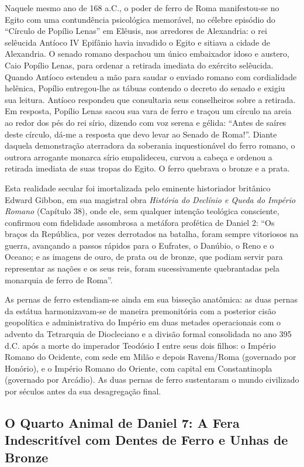 Naquele mesmo ano de 168 a.C., o poder de ferro de Roma manifestou-se no Egito com uma contundência psicológica memorável, no célebre episódio do ``Círculo de Popílio Lenas'' em Elêusis, nos arredores de Alexandria: o rei selêucida Antíoco IV Epifânio havia invadido o Egito e sitiava a cidade de Alexandria. O senado romano despachou um único embaixador idoso e austero, Caio Popílio Lenas, para ordenar a retirada imediata do exército selêucida. Quando Antíoco estendeu a mão para saudar o enviado romano com cordialidade helênica, Popílio entregou-lhe as tábuas contendo o decreto do senado e exigiu sua leitura. Antíoco respondeu que consultaria seus conselheiros sobre a retirada. Em resposta, Popílio Lenas sacou sua vara de ferro e traçou um círculo na areia ao redor dos pés do rei sírio, dizendo com voz serena e gélida: ``Antes de saíres deste círculo, dá-me a resposta que devo levar ao Senado de Roma!''. Diante daquela demonstração aterradora da soberania inquestionável do ferro romano, o outrora arrogante monarca sírio empalideceu, curvou a cabeça e ordenou a retirada imediata de suas tropas do Egito. O ferro quebrava o bronze e a prata.

Esta realidade secular foi imortalizada pelo eminente historiador britânico Edward Gibbon, em sua magistral obra \textit{História do Declínio e Queda do Império Romano} (Capítulo 38), onde ele, sem qualquer intenção teológica consciente, confirmou com fidelidade assombrosa a metáfora profética de Daniel 2:
``Os braços da República, por vezes derrotados na batalha, foram sempre vitoriosos na guerra, avançando a passos rápidos para o Eufrates, o Danúbio, o Reno e o Oceano; e as imagens de ouro, de prata ou de bronze, que podiam servir para representar as nações e os seus reis, foram sucessivamente quebrantadas pela monarquia de ferro de Roma''.

As pernas de ferro estendiam-se ainda em sua bisseção anatômica: as duas pernas da estátua harmonizavam-se de maneira premonitória com a posterior cisão geopolítica e administrativa do Império em duas metades operacionais com o advento da Tetrarquia de Diocleciano e a divisão formal consolidada no ano 395 d.C. após a morte do imperador Teodósio I entre seus dois filhos: o Império Romano do Ocidente, com sede em Milão e depois Ravena/Roma (governado por Honório), e o Império Romano do Oriente, com capital em Constantinopla (governado por Arcádio). As duas pernas de ferro sustentaram o mundo civilizado por séculos antes da sua desagregação final.


\subsection{O Quarto Animal de Daniel 7: A Fera Indescritível com Dentes de Ferro e Unhas de Bronze}


